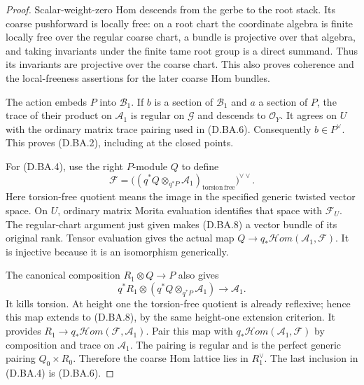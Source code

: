 \begin{proof}
Scalar-weight-zero Hom descends from the gerbe to the root
stack. Its coarse pushforward is locally free: on a root
chart the coordinate algebra is finite locally free over
the regular coarse chart, a bundle is projective over that
algebra, and taking invariants under the finite tame root
group is a direct summand. Thus its invariants are projective
over the coarse chart. This also proves coherence and the
local-freeness assertions for the later coarse Hom bundles.

The action embeds $P$ into $\mathcal B_1$. If $b$ is a
section of $\mathcal B_1$ and $a$ a section of $P$, the
trace of their product on $\mathcal A_1$ is regular on
$\mathcal G$ and descends to $\mathcal O_Y$.
It agrees on $U$ with the ordinary matrix trace pairing
used in (D.BA.6). Consequently $b\in P^\vee$.
This proves (D.BA.2), including at the closed points.

For (D.BA.4), use the right $P$-module $Q$ to define
\[
 \mathcal F=
   \bigl((q^*Q\otimes_{q^*P}\mathcal A_1)_{
                  \mathrm{torsion\,free}}\bigr)^{\vee\vee}.
                                                        \tag{D.BA.8}
\]
Here torsion-free quotient means the image in the specified
generic twisted vector space. On $U$, ordinary matrix
Morita evaluation identifies that space with $\mathcal F_U$.
The regular-chart argument just given makes (D.BA.8) a
vector bundle of its original rank. Tensor evaluation
gives the actual map
$Q\to q_*\mathcal Hom(\mathcal A_1,\mathcal F)$.
It is injective because it is an isomorphism generically.

The canonical composition $R_1\otimes Q\to P$ also gives
\[
 q^*R_1\otimes
   (q^*Q\otimes_{q^*P}\mathcal A_1)
                 \longrightarrow\mathcal A_1.
\]
It kills torsion. At height one the torsion-free quotient
is already reflexive; hence this map extends to (D.BA.8),
by the same height-one extension criterion. It provides
$R_1\to q_*\mathcal Hom(\mathcal F,\mathcal A_1)$.
Pair this map with $q_*\mathcal Hom(\mathcal A_1,\mathcal F)$
by composition and trace on $\mathcal A_1$. The pairing is
regular and is the perfect generic pairing $Q_0\times R_0$.
Therefore the coarse Hom lattice lies in $R_1^\vee$.
The last inclusion in (D.BA.4) is (D.BA.6).
\end{proof}

